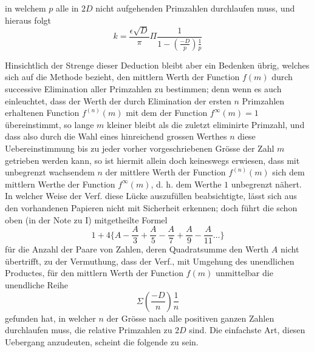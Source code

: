 %
in welchem $p$ alle in $2D$ nicht aufgehenden Primzahlen durchlaufen muss, und hieraus folgt
\[
k=\frac{\epsilon\surd D}\pi\Pi\frac1{1-\left(\frac{-D}p\right)\frac1p}
\]

Hinsichtlich der Strenge dieser Deduction bleibt aber ein Bedenken übrig, welches sich auf die Methode bezieht, den mittlern Werth der Function $f(m)$ durch successive Elimination aller Primzahlen zu bestimmen; denn wenn es auch einleuchtet, dass der Werth der durch Elimination der ersten $n$ Primzahlen erhaltenen Function $f^{(n)}(m)$ mit dem der Function $f^\infty(m)=1$ übereinstimmt, so lange $m$ kleiner bleibt als die zuletzt eliminirte Primzahl, und dass also durch die Wahl eines hinreichend grossen Werthes $n$ diese Uebereinstimmung bis zu jeder vorher vorgeschriebenen Grösse der Zahl $m$ getrieben werden kann, so ist hiermit allein doch keineswegs erwiesen, dass mit unbegrenzt wachsendem $n$ der mittlere Werth der Function $f^{(n)}(m)$ sich dem mittlern Werthe der Function $f^\infty(m)$, d. h. dem Werthe $1$ unbegrenzt nähert. In welcher Weise der Verf. diese Lücke auszufüllen beabsichtigte, lässt sich aus den vorhandenen Papieren nicht mit Sicherheit erkennen; doch führt die schon oben (in der Note zu I) mitgetheilte Formel
\[
1+4\{A-\frac A3+\frac A5-\frac A7+\frac A9-\frac A{11}\ldots\}
\]
für die Anzahl der Paare von Zahlen, deren Quadratsumme den Werth $A$ nicht übertrifft, zu der Vermuthung, dass der Verf., mit Umgehung des unendlichen Productes, für den mittlern Werth der Function $f(m)$ unmittelbar die unendliche Reihe
\[
\Sigma\left(\frac{-D}n\right)\frac1n
\]
gefunden hat, in welcher $n$ der Grösse nach alle positiven ganzen Zahlen durchlaufen muss, die relative Primzahlen zu $2D$ sind. Die einfachste Art, diesen Uebergang anzudeuten, scheint die folgende zu sein.

